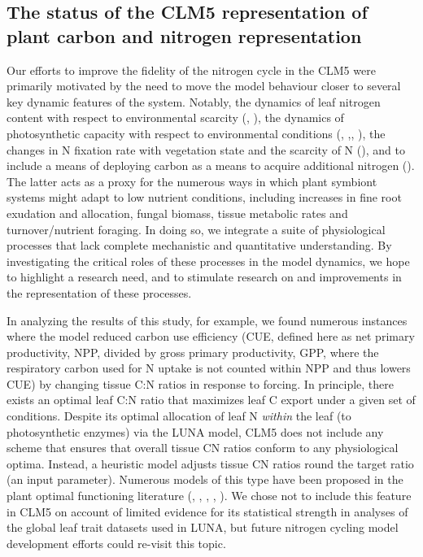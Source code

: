\documentclass[draft,linenumbers]{agujournal}
\begin{document}
\subsection{The status of the CLM5 representation of plant carbon and nitrogen representation}
Our efforts to improve the fidelity of the nitrogen cycle in the CLM5 were primarily motivated by the need to move the model behaviour closer to several key dynamic features of the system. Notably, the dynamics of leaf nitrogen content with respect to environmental scarcity (\cite{lovelock1998}, \cite{brzostek2014}), the dynamics of photosynthetic capacity with respect to environmental conditions (\cite{xu2012}, \cite{ali2016},\cite{rogers2017}, \cite{bloomfield2018}), the changes in N fixation rate with vegetation state and the scarcity of N (\cite{vitousek2002}), and to include a means of deploying carbon as a means to acquire additional nitrogen (\cite{terrer2018}). The latter acts as a proxy for the numerous ways in which plant symbiont systems might adapt to low nutrient conditions, including increases in fine root exudation and allocation, fungal biomass, tissue metabolic rates and turnover/nutrient foraging.  In doing so, we integrate a suite of physiological processes that lack complete mechanistic and quantitative understanding.  By investigating the critical roles of these processes in the model dynamics, we hope to highlight a research need, and to stimulate research on and improvements in the representation of these processes.

In analyzing the results of this study, for example, we found numerous instances where the model reduced carbon use efficiency (CUE, defined here as net primary productivity, NPP, divided by gross primary productivity, GPP, where the respiratory carbon used for N uptake is not counted within NPP and thus lowers CUE) by changing tissue C:N ratios in response to forcing. In principle, there exists an optimal leaf C:N ratio that maximizes leaf C export under a given set of conditions. Despite its optimal allocation of leaf N \emph{within} the leaf (to photosynthetic enzymes) via the LUNA model, CLM5 does not include any scheme that ensures that overall tissue CN ratios conform to any physiological optima. Instead, a heuristic model adjusts tissue CN ratios round the target ratio (an input parameter).  Numerous models of this type have been proposed in the plant optimal functioning literature (\cite{vanwijk2003}, \cite{mcmurtrie2011}, \cite{anten2011} \cite{franklin2012}, \cite{mcmurtrie2013}, \cite{thomas2014}). We chose not to include this feature in CLM5 on account of limited evidence for its statistical strength in analyses of the global leaf trait datasets used in  LUNA, but future nitrogen cycling model development efforts could re-visit this topic. 
\end{document}
